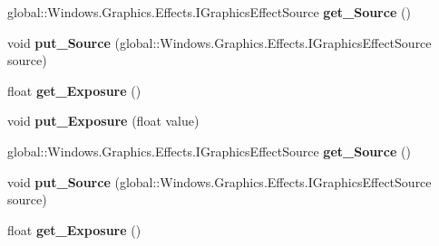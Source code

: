 \begin{DoxyCompactItemize}
global\+::\+Windows.\+Graphics.\+Effects.\+I\+Graphics\+Effect\+Source {\bfseries get\+\_\+\+Source} ()
\item 
\mbox{\label{interface_microsoft_1_1_graphics_1_1_canvas_1_1_effects_1_1_i_exposure_effect_acb4229c8aabe612f5f1c7898033e5826}} 
void {\bfseries put\+\_\+\+Source} (global\+::\+Windows.\+Graphics.\+Effects.\+I\+Graphics\+Effect\+Source source)
\item 
\mbox{\label{interface_microsoft_1_1_graphics_1_1_canvas_1_1_effects_1_1_i_exposure_effect_a1188ad6764c93c08d490ac661c4032b4}} 
float {\bfseries get\+\_\+\+Exposure} ()
\item 
\mbox{\label{interface_microsoft_1_1_graphics_1_1_canvas_1_1_effects_1_1_i_exposure_effect_a2c5a92f7fb62eb7eb49b18388e03bc0c}} 
void {\bfseries put\+\_\+\+Exposure} (float value)
\item 
\mbox{\label{interface_microsoft_1_1_graphics_1_1_canvas_1_1_effects_1_1_i_exposure_effect_a79e10b828da17b64688522fdf34da98b}} 
global\+::\+Windows.\+Graphics.\+Effects.\+I\+Graphics\+Effect\+Source {\bfseries get\+\_\+\+Source} ()
\item 
\mbox{\label{interface_microsoft_1_1_graphics_1_1_canvas_1_1_effects_1_1_i_exposure_effect_acb4229c8aabe612f5f1c7898033e5826}} 
void {\bfseries put\+\_\+\+Source} (global\+::\+Windows.\+Graphics.\+Effects.\+I\+Graphics\+Effect\+Source source)
\item 
\mbox{\label{interface_microsoft_1_1_graphics_1_1_canvas_1_1_effects_1_1_i_exposure_effect_a1188ad6764c93c08d490ac661c4032b4}} 
float {\bfseries get\+\_\+\+Exposure} ()
\item 
\mbox{\label{interface_microsoft_1_1_graphics_1_1_canvas_1_1_effects_1_1_i_exposure_effect_a2c5a92f7fb62eb7eb49b18388e03bc0c}} 

\end{DoxyCompactItemize}
